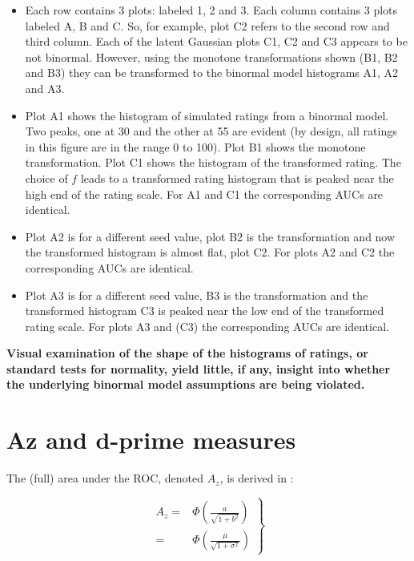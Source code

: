 \documentclass[
]{book}
\begin{document}
\begin{itemize}
\item
  Each row contains 3 plots: labeled 1, 2 and 3. Each column contains 3 plots labeled A, B and C. So, for example, plot C2 refers to the second row and third column. Each of the latent Gaussian plots C1, C2 and C3 appears to be not binormal. However, using the monotone transformations shown (B1, B2 and B3) they can be transformed to the binormal model histograms A1, A2 and A3.
\item
  Plot A1 shows the histogram of simulated ratings from a binormal model. Two peaks, one at 30 and the other at 55 are evident (by design, all ratings in this figure are in the range 0 to 100). Plot B1 shows the monotone transformation. Plot C1 shows the histogram of the transformed rating. The choice of \(f\) leads to a transformed rating histogram that is peaked near the high end of the rating scale. For A1 and C1 the corresponding AUCs are identical.
\item
  Plot A2 is for a different seed value, plot B2 is the transformation and now the transformed histogram is almost flat, plot C2. For plots A2 and C2 the corresponding AUCs are identical.
\item
  Plot A3 is for a different seed value, B3 is the transformation and the transformed histogram C3 is peaked near the low end of the transformed rating scale. For plots A3 and (C3) the corresponding AUCs are identical.
\end{itemize}

\textbf{Visual examination of the shape of the histograms of ratings, or standard tests for normality, yield little, if any, insight into whether the underlying binormal model assumptions are being violated.}

\hypertarget{binormal-model-full-auc}{%
\section{Az and d-prime measures}\label{binormal-model-full-auc}}

The (full) area under the ROC, denoted \(A_z\), is derived in \citep{thompson1989statistical}:

\begin{equation} 
\left.
\begin{aligned}
A_z=&\Phi\left ( \frac{a}{\sqrt{1+b^2}} \right )\\
=&\Phi\left ( \frac{\mu}{\sqrt{1+\sigma^2}} \right )
\end{aligned}
\right\}
\label{eq:binormal-model-ab-2az}
\end{equation}
\end{document}
